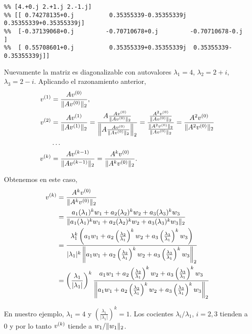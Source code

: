 \begin{verbatim}
%% [4.+0.j 2.+1.j 2.-1.j]
%% [[ 0.74278135+0.j          0.35355339-0.35355339j  0.35355339+0.35355339j]
%%  [-0.37139068+0.j         -0.70710678+0.j         -0.70710678-0.j        ]
%%  [ 0.55708601+0.j          0.35355339+0.35355339j  0.35355339-0.35355339j]]
\end{verbatim}

Nuevamente la matriz es diagonalizable con autovalores $\lambda_1 = 4$, $\lambda_2 = 2 + i$, $\lambda_3 = 2-i$.
Aplicando el razonamiento anterior,
$$
\begin{aligned}
\vb^{(1)} &= \frac{\Ab \vb^{(0)}}{\|\Ab\vb^{(0)}\|_2}, \\
\vb^{(2)} &= \frac{\Ab \vb^{(1)}}{\|\Ab\vb^{(1)}\|_2} =
 \frac{\Ab \frac{\Ab \vb^{(0)}}{\|\Ab\vb^{(0)}\|_2}}{\left\|\Ab \frac{\Ab \vb^{(0)}}{\|\Ab\vb^{(0)}\|_2}\right\|_2} =
 \frac{\frac{\Ab^2 \vb^{(0)}}{\|\Ab\vb^{(0)}\|_2}}{\frac{\|\Ab^2 \vb^{(0)}\|_2}{\|\Ab\vb^{(0)}\|_2}} =
 \frac{\Ab^2 \vb^{(0)}}{\|\Ab^2 \vb^{(0)}\|_2} \\
 &\dots \\
\vb^{(k)} &=  \frac{\Ab \vb^{(k-1)}}{\|\Ab\vb^{(k-1)}\|_2} = \frac{\Ab^k \vb^{(0)}}{\|\Ab^k\vb^{(0)}\|_2}.
\end{aligned}$$

Obtenemos en este caso,
$$
\begin{aligned}
\vb^{(k)} &= \frac{\Ab^k \vb^{(0)}}{\|\Ab^k\vb^{(0)}\|_2}  \\
&= \frac{a_1 (\lambda_1)^k \wb_1 + a_2 (\lambda_2)^k  \wb_2 + a_3 (\lambda_3)^k \wb_3}{\|a_1 (\lambda_1)^k \wb_1 + a_2 (\lambda_2)^k  \wb_2 + a_3 (\lambda_3)^k \wb_3\|_2}  \\
&=\frac{\lambda_1^k\left(a_1 \wb_1 + a_2 \left(\frac{\lambda_2}{\lambda_1}\right)^k  \wb_2 + a_3 \left(\frac{\lambda_3}{\lambda_1}\right)^k \wb_3\right)}{|\lambda_1|^k \left\|a_1 \wb_1 + a_2 \left(\frac{\lambda_2}{\lambda_1}\right)^k  \wb_2 + a_3 \left(\frac{\lambda_3}{\lambda_1}\right)^k \wb_3\right\|_2} \\
&= \left(\frac{\lambda_1}{|\lambda_1|}\right)^k \frac{a_1 \wb_1 + a_2 \left(\frac{\lambda_2}{\lambda_1}\right)^k  \wb_2 + a_3 \left(\frac{\lambda_3}{\lambda_1}\right)^k \wb_3}{\left\|a_1 \wb_1 + a_2 \left(\frac{\lambda_2}{\lambda_1}\right)^k  \wb_2 + a_3 \left(\frac{\lambda_3}{\lambda_1}\right)^k \wb_3\right\|_2}
\end{aligned}$$

En nuestro ejemplo, $\lambda_1 = 4$ y $\left(\frac{\lambda_1}{|\lambda_1|}\right)^k = 1$. Los cocientes $\lambda_i / \lambda_1$, $i = 2, 3$ tienden a $0$ y por lo tanto $\vb^{(k)}$ tiende a $\wb_1 / \|\wb_1\|_2$.

